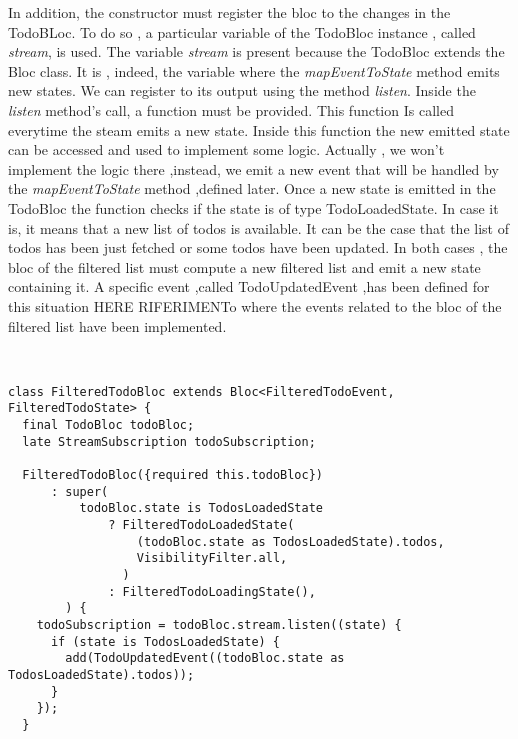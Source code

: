 In addition, the constructor must register the bloc to the changes in the TodoBLoc. To do so , a particular variable of the TodoBloc instance , called \textit{stream}, is used. The variable \textit{stream} is present because the TodoBloc extends the Bloc class. It is , indeed, the variable where the \textit{mapEventToState} method emits new states. We can register to its output using the method \textit{listen}. Inside the \textit{listen} method’s call, a function must be provided. This function Is called everytime the steam emits a new state. Inside this function the new emitted state can be accessed and used to implement some logic. Actually , we won’t implement the logic there ,instead, we emit a new event that will be handled by the \textit{mapEventToState} method ,defined later. Once a new state is emitted in the TodoBloc the function checks if the state is of type TodoLoadedState. In case it is, it means that a new list of todos is available. It can be the case that the list of todos has been just fetched or some todos have been updated. In both cases , the bloc of the filtered list must compute a new filtered list and emit a new state containing it. A specific event ,called TodoUpdatedEvent ,has been defined for this situation HERE RIFERIMENTo where the events related to the bloc of the filtered list have been implemented.
\begin{code}
\mbox{}\\
 \mbox{}
\label{code:2.14}
\begin{verbatim}
class FilteredTodoBloc extends Bloc<FilteredTodoEvent, FilteredTodoState> {
  final TodoBloc todoBloc;
  late StreamSubscription todoSubscription;

  FilteredTodoBloc({required this.todoBloc})
      : super(
          todoBloc.state is TodosLoadedState
              ? FilteredTodoLoadedState(
                  (todoBloc.state as TodosLoadedState).todos,
                  VisibilityFilter.all,
                )
              : FilteredTodoLoadingState(),
        ) {
    todoSubscription = todoBloc.stream.listen((state) {
      if (state is TodosLoadedState) {
        add(TodoUpdatedEvent((todoBloc.state as TodosLoadedState).todos));
      }
    });
  }
\end{verbatim}
\mbox{}
\end{code}

